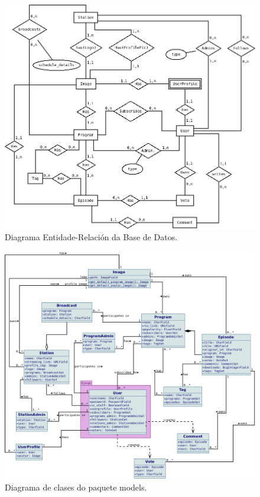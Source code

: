 \begin{figure}[h]
	\centering
	\includegraphics[scale=0.5,keepaspectratio=true]{./images/ER_diagrama.png}
	\caption{Diagrama Entidade-Relación da Base de Datos.}
	\label{fig:diagrama_er}
\end{figure}

\begin{figure}[h]
	\centering
	\includegraphics[scale=0.4,keepaspectratio=true]{./images/class_diagram.png}
	\caption{Diagrama de clases do paquete models.}
	\label{fig:clase_models}
\end{figure}


